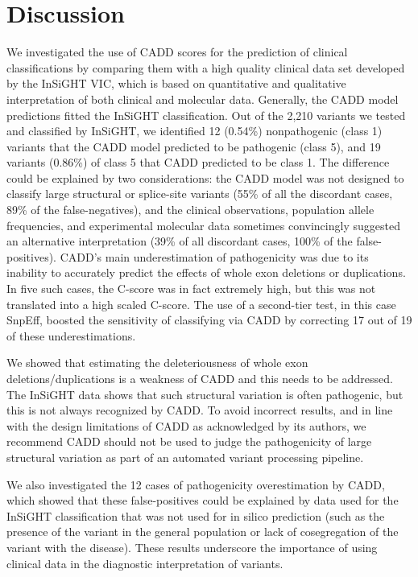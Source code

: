 \section{Discussion}
We investigated the use of CADD scores for the prediction of clinical classifications by comparing them with a high quality clinical data set developed by the InSiGHT VIC, which is based on quantitative and qualitative interpretation of both clinical and molecular data.
Generally, the CADD model predictions fitted the InSiGHT classification.
Out of the 2,210 variants we tested and classified by InSiGHT, we identified 12 (0.54\%) nonpathogenic (class 1) variants that the CADD model predicted to be pathogenic (class 5), and 19 variants (0.86\%) of class 5 that CADD predicted to be class 1.
The difference could be explained by two considerations: the CADD model was not designed to classify large structural or splice-site variants (55\% of all the discordant cases, 89\% of the false-negatives), and the clinical observations, population allele frequencies, and experimental molecular data sometimes convincingly suggested an alternative interpretation (39\% of all discordant cases, 100\% of the false-positives).
CADD’s main underestimation of pathogenicity was due to its inability to accurately predict the effects of whole exon deletions or duplications.
In five such cases, the C-score was in fact extremely high, but this was not translated into a high scaled C-score.
The use of a second-tier test, in this case SnpEff, boosted the sensitivity of classifying via CADD by correcting 17 out of 19 of these underestimations.

We showed that estimating the deleteriousness of whole exon deletions/duplications is a weakness of CADD and this needs to be addressed.
The InSiGHT data shows that such structural variation is often pathogenic, but this is not always recognized by CADD.
To avoid incorrect results, and in line with the design limitations of CADD as acknowledged by its authors, we recommend CADD should not be used to judge the pathogenicity of large structural variation as part of an automated variant processing pipeline.

We also investigated the 12 cases of pathogenicity overestimation by CADD, which showed that these false-positives could be explained by data used for the InSiGHT classification that was not used for in silico prediction (such as the presence of the variant in the general population or lack of cosegregation of the variant with the disease).
These results underscore the importance of using clinical data in the diagnostic interpretation of variants.

